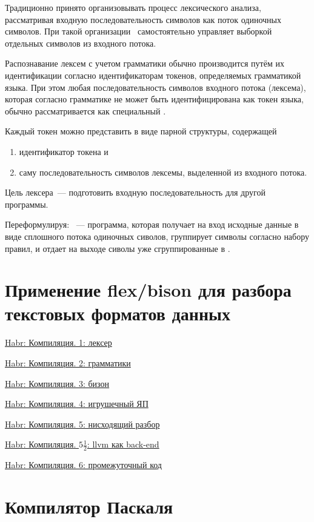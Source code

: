 Традиционно принято организовывать процесс лексического анализа, рассматривая
входную последовательность символов как поток одиночных символов. При такой
организации \ самостоятельно управляет выборкой отдельных символов
из входного потока.

Распознавание лексем с учетом грамматики обычно производится путём их
идентификации согласно идентификаторам токенов, определяемых грамматикой языка.
При этом любая последовательность символов входного потока (лексема), которая
согласно грамматике не может быть идентифицирована как токен языка, обычно
рассматривается как специальный .

Каждый токен можно представить в виде парной структуры, содержащей
\begin{enumerate}
  \item идентификатор токена и
  \item саму последовательность символов лексемы, выделенной из входного
потока.
\end{enumerate}

Цель лексера\ --- подготовить входную последовательность для другой программы.

\begin{framed}
Переформулируя: \ --- программа, которая получает на вход исходные
данные в виде сплошного потока одиночных сиволов, группирует символы согласно
набору правил, и отдает на выходе сиволы уже сгруппированные в . 
\end{framed}

\section{Применение flex/bison для разбора текстовых форматов данных}

\href{http://habrahabr.ru/post/99162/}{Habr: Компиляция. 1: лексер}

\href{http://habrahabr.ru/post/99298/}{Habr: Компиляция. 2: грамматики}

\href{http://habrahabr.ru/post/99366/}{Habr: Компиляция. 3: бизон}

\href{http://habrahabr.ru/post/99397/}{Habr: Компиляция. 4: игрушечный ЯП}

\href{http://habrahabr.ru/post/99466/}{Habr: Компиляция. 5: нисходящий разбор}

\href{http://habrahabr.ru/post/102597/}{Habr: Компиляция. $5\frac{1}{2}$: llvm
как back-end}

\href{http://habrahabr.ru/post/99592/}{Habr: Компиляция. 6: промежуточный код}


\section{Компилятор Паскаля}

